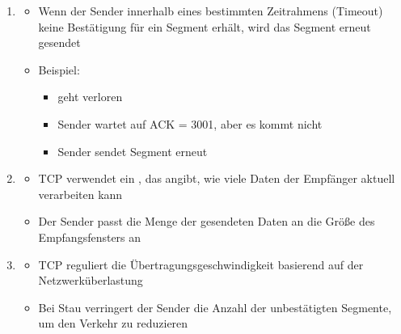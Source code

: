 \begin{infoBox}[title=Ablauf der Datenübertragung]
\begin{enumerate}
\begin{itemize}
            \item Der Empfänger prüft jedes Segment:
            \begin{itemize}
                \item {}\\
                $\rightarrow$ Wenn nicht, wird das Segment verworfen
                \item {}\\
                $\rightarrow$ Wenn ja, sendet der Empfänger eine , die das nächste erwartete Byte angibt
            \end{itemize}
            \item Beispiel:
            \begin{itemize}
                \item Empfänger erhält  und bestätigt mit ACK = 1501
            \end{itemize}
        \end{itemize}
        \item {}
        \begin{itemize}
            \item Wenn der Sender innerhalb eines bestimmten Zeitrahmens (Timeout) keine Bestätigung für ein Segment erhält, wird das Segment erneut gesendet
            \item Beispiel:
            \begin{itemize}
                \item {} geht verloren
                \item Sender wartet auf ACK = 3001, aber es kommt nicht
                \item Sender sendet Segment erneut
            \end{itemize}
        \end{itemize}
        \item {}
        \begin{itemize}
            \item TCP verwendet ein , das angibt, wie viele Daten der Empfänger aktuell verarbeiten kann
            \item Der Sender passt die Menge der gesendeten Daten an die Größe des Empfangsfensters an
        \end{itemize}
        \item {}
        \begin{itemize}
            \item TCP reguliert die Übertragungsgeschwindigkeit basierend auf der Netzwerküberlastung
            \item Bei Stau verringert der Sender die Anzahl der unbestätigten Segmente, um den Verkehr zu reduzieren
        \end{itemize}
    \end{enumerate}
\end{infoBox}
